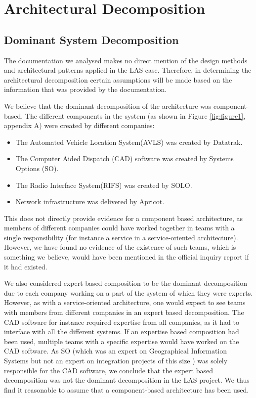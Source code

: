 \section*{Architectural Decomposition}

\subsection*{Dominant System Decomposition}

The documentation we analysed makes no direct mention of the design methods and architectural patterns applied in the LAS case.
Therefore, in determining the architectural decomposition certain assumptions will be made based on the information that was provided by the documentation.

We believe that the dominant decomposition of the architecture was component-based.
The different components in the system (as shown in Figure \ref{fig:figure1}, appendix A) were created by different companies:
\begin{itemize}[noitemsep]
\item The Automated Vehicle Location System(AVLS) was created by Datatrak.
\item The Computer Aided Dispatch (CAD) software was created by Systems Options (SO).
\item The Radio Interface System(RIFS) was created by SOLO.
\item Network infrastructure was delivered by Apricot.
\end{itemize}

This does not directly provide evidence for a component based architecture, as members of different companies could have worked together in teams with a single responsibility
(for instance a service in a service-oriented architecture).
However, we have found no evidence of the existence of such teams, which is something we believe, would have been mentioned in the official inquiry report \autocite{officialreport} if it had existed.

We also considered expert based composition to be the dominant decomposition due to each company working on a part of the system of which they were experts.
However, as with a service-oriented architecture, one would expect to see teams with members from different companies in an expert based decomposition.
The CAD software for instance required expertise from all companies, as it had to interface with all the different systems.
If an expertise based composition had been used, multiple teams with a specific expertise would have worked on the CAD software.
As SO (which was an expert on Geographical Information Systems \autocite{techsum} but not an expert on integration projects of this size \cite[s3078]{officialreport}) was solely responsible for the CAD software,
we conclude that the expert based decomposition was not the dominant decomposition in the LAS project.
We thus find it reasonable to assume that a component-based architecture has been used.

